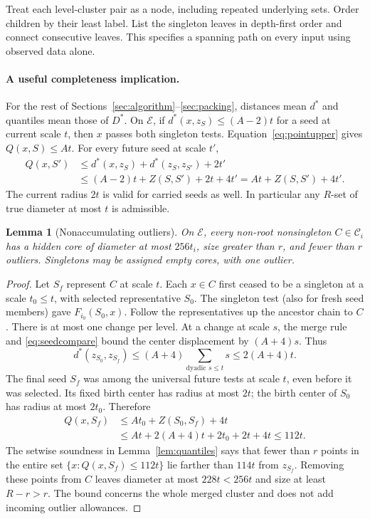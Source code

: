 \documentclass[acmsmall,11pt,nonacm]{acmart}
\newtheorem{lemma}[theorem]{Lemma}
\theoremstyle{definition}
\newcommand{\calC}{\mathcal C}
\newcommand{\calE}{\mathcal E}
\begin{document}
Treat each level-cluster pair as a node, including repeated underlying sets.
Order children by their least label. List the singleton leaves in depth-first
order and connect consecutive leaves. This specifies a spanning path on every
input using observed data alone.

\paragraph{A useful completeness implication.}
For the rest of Sections~\ref{sec:algorithm}--\ref{sec:packing}, distances
mean $d^*$ and quantiles mean those of $D^*$. On $\calE$, if
$d^*(x,z_S)\leq(A-2)t$ for a seed at current scale $t$, then $x$ passes
both singleton tests. Equation~\eqref{eq:pointupper} gives $Q(x,S)\leq At$.
For every future seed at scale $t'$,
\begin{align*}
 Q(x,S')&\leq d^*(x,z_S)+d^*(z_S,z_{S'})+2t'\\
 &\leq(A-2)t+Z(S,S')+2t+4t'=At+Z(S,S')+4t'.
\end{align*}
The current radius $2t$ is valid for carried seeds as well.
In particular any $R$-set of true diameter at most $t$ is admissible.

\begin{lemma}[Nonaccumulating outliers]\label{lem:nonaccum}
On $\calE$, every non-root nonsingleton $C\in\calC_i$ has a hidden
core of diameter at most $256t_i$, size greater than $r$, and fewer
than $r$ outliers. Singletons may be assigned empty cores, with one outlier.
\end{lemma}
\begin{proof}
Let $S_f$ represent $C$ at scale $t$. Each $x\in C$ first ceased to be
a singleton at a scale $t_0\leq t$, with selected representative $S_0$.
The singleton test (also for fresh seed members) gave $F_{i_0}(S_0,x)$.
Follow the representatives up the ancestor chain to $C$. There is at most
one change per level. At a change at scale $s$, the merge rule and
\eqref{eq:seedcompare} bound the center displacement by $(A+4)s$.
Thus
\[
 d^*(z_{S_0},z_{S_f})\leq(A+4)\sum_{\text{dyadic }s\leq t}s
 \leq2(A+4)t.
\]
The final seed $S_f$ was among the universal future tests at scale $t$,
even before it was selected. Its fixed birth center has radius at most $2t$;
the birth center of $S_0$ has radius at most $2t_0$. Therefore
\begin{align*}
 Q(x,S_f)&\leq At_0+Z(S_0,S_f)+4t\\
 &\leq At+2(A+4)t+2t_0+2t+4t\leq112t.
\end{align*}
The setwise soundness in Lemma~\ref{lem:quantiles} says that fewer than
$r$ points in the entire set $\{x:Q(x,S_f)\leq112t\}$ lie farther than
$114t$ from $z_{S_f}$. Removing these points from $C$ leaves diameter
at most $228t<256t$ and size at least $R-r>r$.
The bound concerns the whole merged cluster and does not add incoming
outlier allowances.
\end{proof}
\end{document}

